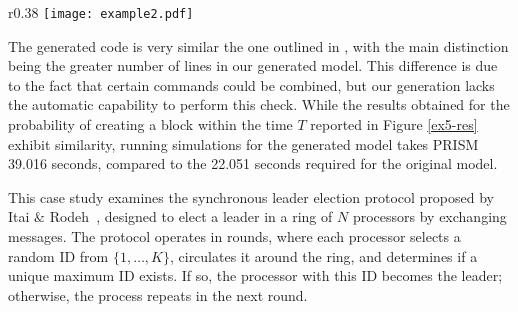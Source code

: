 \begin{comment}
   [NGRDF] (Network=0)  $\rightarrow$  
   	1 : (set2'=addBlockSet(set2,b2))$\&$(set3'=addBlockSet(set3,b3))$\&$(set4'=addBlockSet(set4,b4))$\&$(set5'=addBlockSet(set5,b5))$\&$(Network'=0); 
   [PCRLD] (Network=0)  $\rightarrow$  
   	1 : (set2'=addBlockSet(set2,b2))$\&$(set3'=addBlockSet(set3,b3))$\&$(set4'=addBlockSet(set4,b4))$\&$(set5'=addBlockSet(set5,b5))$\&$(Network'=0); 
   [MDDCF] (Network=0)  $\rightarrow$  1 : (set1' = removeBlock(set1,b1))$\&$(Network'=0); 
   [IQVPA] (Network=0)  $\rightarrow$  1 : (set1' = removeBlock(set1,b1))$\&$(Network'=0); 
   $\ldots$
endmodule

module Vote_Manager
   Vote_Manager : [0..1] init 0;
   epoch : [0..10] init 0;
   Votes : hash[];  
   tot_stake : [0..120000] init 50; 
   stake1 : [0..N] init 10; 
   stake2 : [0..N] init 10; 
   stake3 : [0..N] init 10; 
   stake4 : [0..N] init 10; 
   stake5 : [0..N] init 10; 

   [VSJBE] (Vote_Manager=0)  $\rightarrow$  
   	1 : (Votes'=addVote(Votes,b1,stake1))$\&$(Vote_Manager'=0); 
   $\ldots$
endmodule

\end{lstlisting}
\end{comment}

\begin{wrapfigure}{r}{0.38\textwidth}
	\vspace{-0.75cm}
	\centering
	\texttt{[image: example2.pdf]}	
	\vspace{-0.35cm}
	\caption{}
	\label{ex5-res}
	\vspace{-0.75cm}
	\end{wrapfigure}
        The generated code is very similar the one outlined in
        \cite{DBLP:journals/distribledger/GallettaLMV23}, with the
        main distinction being the greater number of lines in our
        generated model.  This difference is due to the fact that
        certain commands could be combined, but our generation lacks
        the automatic capability to perform this check. While the
        results obtained for the probability of creating a block within the time $T$
        reported in Figure \ref{ex5-res} exhibit similarity, running
        simulations for the generated model takes PRISM 39.016
        seconds, compared to the 22.051 seconds required for the
        original model.



This case study examines the synchronous leader election protocol proposed by Itai $\&$ Rodeh~\cite{IR90}, designed to elect a leader in a ring of $N$ processors by exchanging messages. The protocol operates in rounds, where each processor selects a random ID from $\{1, \ldots, K\}$, circulates it around the ring, and determines if a unique maximum ID exists. If so, the processor with this ID becomes the leader; otherwise, the process repeats in the next round.


